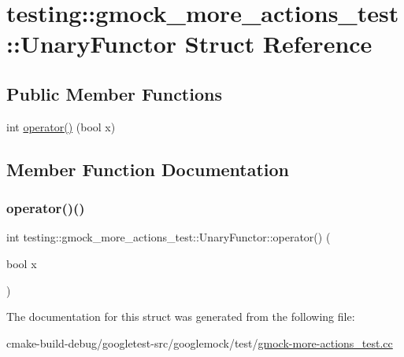 \hypertarget{structtesting_1_1gmock__more__actions__test_1_1UnaryFunctor}{}\section{testing\+::gmock\+\_\+more\+\_\+actions\+\_\+test\+::Unary\+Functor Struct Reference}
\label{structtesting_1_1gmock__more__actions__test_1_1UnaryFunctor}
\subsection*{Public Member Functions}
\begin{DoxyCompactItemize}
\item 
int \mbox{\hyperlink{structtesting_1_1gmock__more__actions__test_1_1UnaryFunctor_a3c33592b266e8ed2c7980df9868db53a}{operator()}} (bool x)
\end{DoxyCompactItemize}


\subsection{Member Function Documentation}
\mbox{\label{structtesting_1_1gmock__more__actions__test_1_1UnaryFunctor_a3c33592b266e8ed2c7980df9868db53a}} 
\subsubsection{\texorpdfstring{operator()()}{operator()()}}
{\footnotesize\ttfamily int testing\+::gmock\+\_\+more\+\_\+actions\+\_\+test\+::\+Unary\+Functor\+::operator() (\begin{DoxyParamCaption}\item[{bool}]{x }\end{DoxyParamCaption})\hspace{0.3cm}{\ttfamily [inline]}}



The documentation for this struct was generated from the following file\+:\begin{DoxyCompactItemize}
\item 
cmake-\/build-\/debug/googletest-\/src/googlemock/test/\mbox{\hyperlink{gmock-more-actions__test_8cc}{gmock-\/more-\/actions\+\_\+test.\+cc}}\end{DoxyCompactItemize}
